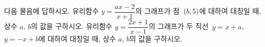 다음 물음에 답하시오.
 유리함수 $y=\dfrac{ax-2}{x+1}$의 그래프가 점~$(b{,}\mkern3mu\mathopen{}5)$에 대하여 대칭일 때, 상수 $a$, $b$의 값을 구하시오.
 유리함수 $y=\dfrac{2x+1}{x-1}$의 그래프가 두 직선~$y=x+a$, $y=-x+b$에 대하여 대칭일 때, 상수 $a$, $b$의 값을 구하시오.
